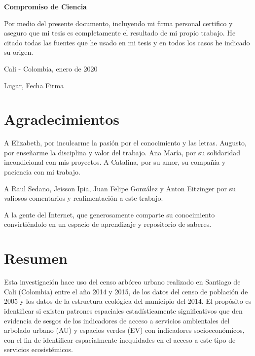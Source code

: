 \documentclass[12pt,a4paper,oneside, openany]{book}
\title{}
\author{}
\date{}
\theoremstyle{definition}
\theoremstyle{definition}
\theoremstyle{definition}
\theoremstyle{remark}
\begin{document}
% 


\textbf{Compromiso de Ciencia}

Por medio del presente documento, incluyendo mi firma personal certifico
y aseguro que mi tesis es completamente el resultado de mi propio
trabajo. He citado todas las fuentes que he usado en mi tesis y en todos
los casos he indicado su origen.

\bigskip

Cali - Colombia, enero de 2020

\hrulefill 

Lugar, Fecha \hfill Firma

\chapter*{Agradecimientos}\label{agradecimientos}

A Elizabeth, por inculcarme la pasión por el conocimiento y las letras.
Augusto, por enseñarme la disciplina y valor del trabajo. Ana María, por
su solidaridad incondicional con mis proyectos. A Catalina, por su amor,
su compañía y paciencia con mi trabajo.

A Raul Sedano, Jeisson Ipia, Juan Felipe González y Anton Eitzinger por
su valiosos comentarios y realimentación a este trabajo.

A la gente del Internet, que generosamente comparte su conocimiento
convirtiéndolo en un espacio de aprendizaje y repositorio de saberes.


\chapter*{Resumen}\label{resumen}


Esta investigación hace uso del censo arbóreo urbano realizado en
Santiago de Cali (Colombia) entre el año 2014 y 2015, de los datos del
censo de población de 2005 y los datos de la estructura ecológica del
municipio del 2014. El propósito es identificar si existen patrones
espaciales estadísticamente significativos que den evidencia de sesgos
de los indicadores de acceso a servicios ambientales del arbolado urbano
(AU) y espacios verdes (EV) con indicadores socioeconómicos, con el fin
de identificar espacialmente inequidades en el acceso a este tipo de
servicios ecosistémicos.
\end{document}
